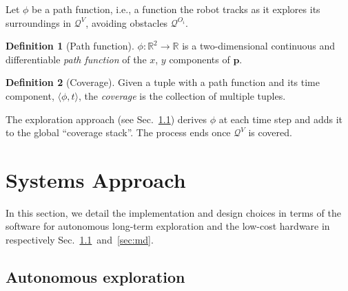 \documentclass[letterpaper,10pt,conference,twoside]{IEEEtran}
\theoremstyle{definition}
\newtheorem{defn}{Definition}[section]
\begin{document}
Let $\phi$ be a path function, i.e., a function the robot tracks as it explores its surroundings in $\mathcal{Q}^V$, avoiding %
obstacles $\mathcal{Q}^{O_i}$.

\begin{defn}[Path function]\label{def:pf}
  $\phi:\mathbb{R}^2\rightarrow\mathbb{R}$ is a two-dimensional continuous and differentiable \textit{path function} of the $x$, $y$ components of $\mathbf{p}$.
\end{defn}

\begin{defn}[Coverage]\label{def:co}
  Given a tuple with a path function and its time component, $\langle\phi,t\rangle$, the \textit{coverage} is the collection of multiple tuples.
\end{defn}

The %
exploration approach %
(see Sec.~\ref{sec:le}) derives $\phi$ at each time step and adds it to the global ``coverage stack''. The process ends once $\mathcal{Q}^V$ is covered.


\section{Systems Approach}
\label{sec:m}
\noindent
In this section, we detail the implementation and design choices in terms of %
the software for autonomous long-term %
exploration and the low-cost hardware in respectively Sec.~\ref{sec:le}~and~\ref{sec:md}.

\subsection{Autonomous %
exploration}
\label{sec:le}
\end{document}
